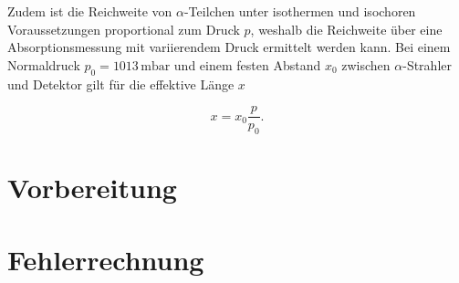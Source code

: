 \noindent Zudem ist die Reichweite von $\alpha$-Teilchen unter isothermen und isochoren Voraussetzungen proportional zum Druck $p$, 
weshalb die Reichweite über eine Absorptionsmessung mit variierendem Druck ermittelt werden kann. Bei einem Normaldruck 
$p_0 = 1013\,\unit{\milli\bar}$ und einem festen Abstand $x_0$ zwischen $\alpha$-Strahler und Detektor gilt für die effektive Länge $x$

\begin{equation}
\label{eqn:effLaenge}
    x = x_0\frac{p}{p_0}.
\end{equation}

\section{Vorbereitung}

\section{Fehlerrechnung}

